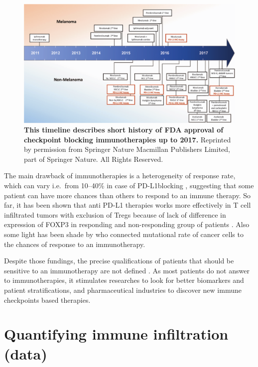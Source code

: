 \documentclass[12pt,]{book}
\theoremstyle{definition}
\theoremstyle{definition}
\theoremstyle{definition}
\theoremstyle{remark}
\begin{document}
\begin{figure}

{\centering \includegraphics[width=1\linewidth]{figures-ext/02-timeline-immunotherapies} 

}

\caption{\textbf{This timeline describes
short history of FDA approval of checkpoint blocking immunotherapies up
to 2017.} Reprinted by permission from Springer Nature
\citep{Taube2017a} Macmillan Publishers Limited, part of Springer
Nature. All Rights Reserved.}\label{fig:timeline-immunotherapies}
\end{figure}







The main drawback of immunotherapies is a heterogeneity of response
rate, which can vary i.e.~from 10--40\% in case of PD-L1blocking
\citep{Zou2016}, suggesting that some patient can have more chances than
others to respond to an immune therapy. So far, it has been shown that
anti PD-L1 therapies works more effectively in T cell infiltrated tumors
with exclusion of Tregs because of lack of difference in expression of
FOXP3 in responding and non-responding group of patients
\citep{Herbst2014}. Also some light has been shade by \citet{Rizvi2015}
who connected mutational rate of cancer cells to the chances of response
to an immunotherapy.

Despite those fundings, the precise qualifications of patients that
should be sensitive to an immunotherapy are not defined
\citep{Pitt2016}. As most patients do not answer to immunotherapies, it
stimulates researches to look for better biomarkers and patient
stratifications, and pharmaceutical industries to discover new immune
checkpoints based therapies.

\hypertarget{quantifying-immune-infiltration-data}{%
\section{Quantifying immune infiltration
(data)}\label{quantifying-immune-infiltration-data}}
\end{document}

